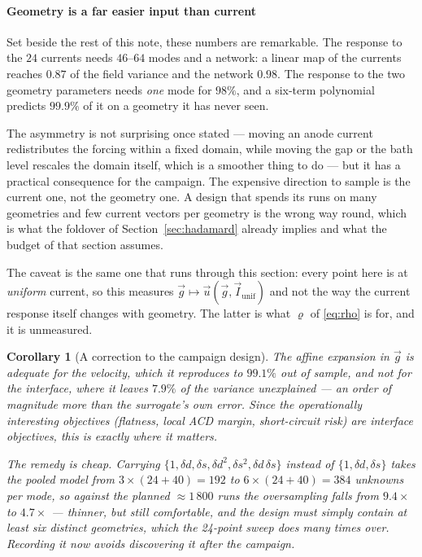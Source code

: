 \documentclass[11pt,a4paper]{article}
\theoremstyle{plain}
\newtheorem{corollary}[proposition]{Corollary}
\theoremstyle{definition}
\theoremstyle{remark}
\begin{document}
\paragraph{Geometry is a far easier input than current}
Set beside the rest of this note, these numbers are remarkable. The response to
the $24$ currents needs $46$--$64$ modes and a network: a linear map of the
currents reaches $0.87$ of the field variance and the network $0.98$. The
response to the two geometry parameters needs \emph{one} mode for $98\%$, and a
six-term polynomial predicts $99.9\%$ of it on a geometry it has never seen.

The asymmetry is not surprising once stated --- moving an anode current
redistributes the forcing within a fixed domain, while moving the gap or the
bath level rescales the domain itself, which is a smoother thing to do --- but it
has a practical consequence for the campaign. The expensive direction to sample
is the current one, not the geometry one. A design that spends its runs on many
geometries and few current vectors per geometry is the wrong way round, which is
what the foldover of Section~\ref{sec:hadamard} already implies and what the
budget of that section assumes.

The caveat is the same one that runs through this section: every point here is
at \emph{uniform} current, so this measures $\vec g \mapsto \vec u(\vec g,
\vec I_{\mathrm{unif}})$ and not the way the current response itself changes with
geometry. The latter is what $\varrho$ of \eqref{eq:rho} is for, and it is
unmeasured.

\begin{corollary}[A correction to the campaign design]
\label{cor:geom-quadratic}
The affine expansion in $\vec g$ is adequate for the velocity, which it
reproduces to $99.1\%$ out of sample, and \emph{not} for the interface, where it
leaves $7.9\%$ of the variance unexplained --- an order of magnitude more than
the surrogate's own error. Since the operationally interesting objectives
(flatness, local ACD margin, short-circuit risk) are interface objectives, this
is exactly where it matters.

The remedy is cheap. Carrying $\{1, \delta d, \delta s, \delta d^2, \delta s^2,
\delta d\,\delta s\}$ instead of $\{1, \delta d, \delta s\}$ takes the pooled
model from $3\times(24+40) = 192$ to $6\times(24+40) = 384$ unknowns per mode,
so against the planned ${\approx}1\,800$ runs the oversampling falls from
$9.4\times$ to $4.7\times$ --- thinner, but still comfortable, and the design
must simply contain at least six distinct geometries, which the 24-point sweep
does many times over. Recording it now avoids discovering it after the campaign.
\end{corollary}
\end{document}
